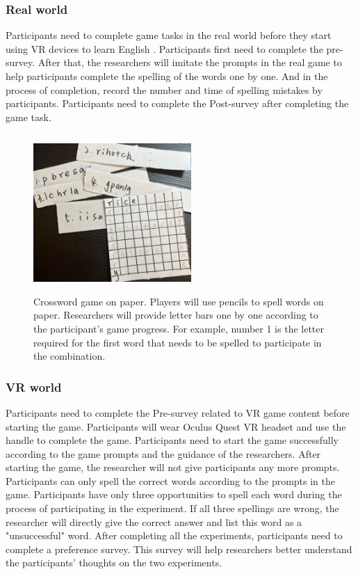 \documentclass{vgtc}                          %
\begin{document}
\subsubsection{Real world}
Participants need to complete game tasks in the real world before they start using VR devices to learn English \cite{dewi2017effect}. Participants first need to complete the pre-survey. After that, the researchers will imitate the prompts in the real game to help participants complete the spelling of the words one by one. And in the process of completion, record the number and time of spelling mistakes by participants. Participants need to complete the Post-survey after completing the game task.
\begin{figure}[H]
 \centering
 \includegraphics[width=6cm, height=6cm]{pictures/Real World.png}
 \caption{Crossword game on paper. Players will use pencils to spell words on paper. Researchers will provide letter bars one by one according to the participant’s game progress. For example, number 1 is the letter required for the first word that needs to be spelled to participate in the combination.}
 \label{fig:realworld}
\end{figure}
\subsubsection{VR world}
Participants need to complete the Pre-survey related to VR game content before starting the game. Participants will wear Oculus Quest VR headset and use the handle to complete the game. Participants need to start the game successfully according to the game prompts and the guidance of the researchers. After starting the game, the researcher will not give participants any more prompts. Participants can only spell the correct words according to the prompts in the game. Participants have only three opportunities to spell each word during the process of participating in the experiment. If all three spellings are wrong, the researcher will directly give the correct answer and list this word as a "unsuccessful" word. After completing all the experiments, participants need to complete a preference survey. This survey will help researchers better understand the participants’ thoughts on the two experiments.
\end{document}
